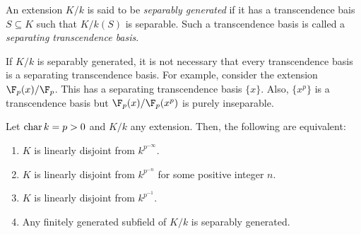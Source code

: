 \begin{definition}
    An extension $K/k$ is said to be \emph{separably generated} if it has a transcendence bais $S\subseteq K$ such that $K/k(S)$ is separable. Such a transcendence basis is called a \emph{separating transcendence basis}.
\end{definition}

\begin{remark}
    If $K/k$ is separably generated, it is not necessary that every transcendence basis is a separating transcendence basis. For example, consider the extension $\F_p(x)/\F_p$. This has a separating transcendence basis $\{x\}$. Also, $\{x^p\}$ is a transcendence basis but $\F_p(x)/\F_p(x^p)$ is purely inseparable.
\end{remark}

\begin{theorem}[McLane]
    Let $\operatorname{char} k = p > 0$ and $K/k$ any extension. Then, the following are equivalent: 
    \begin{enumerate}[label=(\alph*)]
        \item $K$ is linearly disjoint from $k^{p^{-\infty}}$. 
        \item $K$ is linearly disjoint from $k^{p^{-n}}$ for some positive integer $n$. 
        \item $K$ is linearly disjoint from $k^{p^{-1}}$. 
        \item Any finitely generated subfield of $K/k$ is separably generated.
    \end{enumerate}
\end{theorem}
